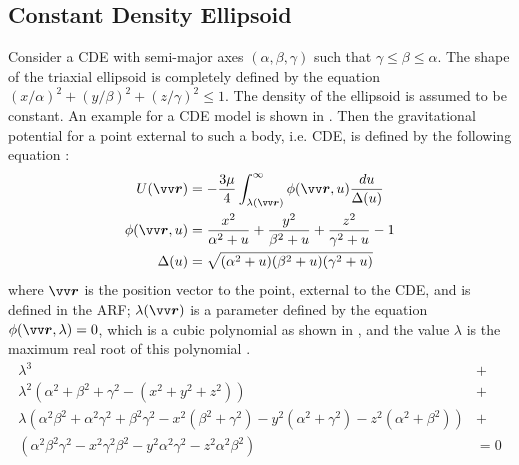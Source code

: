 \subsection{Constant Density Ellipsoid}
\label{subsec:constant_density_ellipsoid}
Consider a \gls{CDE} with semi-major axes $(\alpha, \beta, \gamma)$ such that $\gamma \leq \beta \leq \alpha$. The shape of the triaxial ellipsoid is completely defined by the equation $(x/\alpha)^2 + (y/\beta)^2 + (z/\gamma)^2 \leq 1$. The density of the ellipsoid is assumed to be constant. An example for a \gls{CDE} model is shown in .  Then the gravitational potential for a point external to such a body, i.e. \gls{CDE}, is defined by the following equation \parencite{scheeresBook}:
\begin{align}
    U(\bvector{r}) &= -\frac{3\mu}{4} \int_{\lambda(\bvector{r})}^{\infty} \phi(\bvector{r}, u) \frac{du}{\Delta(u)}
    \label{eqn:ellipsoid_potential_short_form} \\
    \phi(\bvector{r}, u) &= \frac{x^2}{\alpha^2 + u} + \frac{y^2}{\beta^2 + u} + \frac{z^2}{\gamma^2 + u} - 1
    \label{eqn:ellipsoid_potential_phi} \\
    \Delta(u) &= \sqrt{(\alpha^2 + u)(\beta^2 + u)(\gamma^2 + u)}
    \label{eqn:ellipsoid_potential_delta}
\end{align}
where $\bvector{r}$ is the position vector to the point, external to the \gls{CDE}, and is defined in the \gls{ARF}; $\lambda(\bvector{r})$ is a parameter defined by the equation $\phi(\bvector{r}, \lambda) = 0$, which is a cubic polynomial as shown in , and the value $\lambda$ is the maximum real root of this polynomial \parencite{scheeresBook}.
\begin{align}
    \lambda^3 &+ \nonumber \\
    \lambda^2 (\alpha^2 + \beta^2 + \gamma^2 - (x^2 + y^2 + z^2)) &+ \nonumber \\
    \lambda (\alpha^2 \beta^2 + \alpha^2 \gamma^2 + \beta^2 \gamma^2 - x^2(\beta^2 + \gamma^2) - y^2(\alpha^2 + \gamma^2) - z^2(\alpha^2 + \beta^2)) &+ \nonumber \\
    (\alpha^2 \beta^2 \gamma^2 - x^2 \gamma^2 \beta^2 - y^2 \alpha^2 \gamma^2 - z^2 \alpha^2 \beta^2) &= 0
    \label{eqn:cubicPolynomial}
\end{align}
